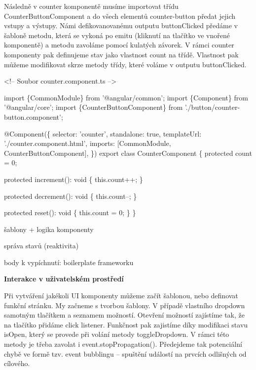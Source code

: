 Následně v counter komponentě musíme importovat třídu CounterButtonComponent a do všech elementů counter-button předat jejich vstupy a výstupy. 
Námi defikovanovanému outputu buttonClicked předáme v šabloně metodu, která se vykoná po emitu (kliknutí na tlačítko ve vnořené komponentě) a metodu zavoláme pomocí kulatých závorek. 
V rámci counter komponenty pak definujeme stav jako vlastnost count na třídě. Vlastnost pak můžeme modifikovat skrze metody třídy, které voláme v outputu buttonClicked.

\begin{prog}
<!-- Soubor counter.component.ts -->

import \{CommonModule\} from '@angular/common';
import \{Component\} from '@angular/core';
import \{CounterButtonComponent\} from './button/counter-button.component';

@Component(\{
  selector: 'counter',
  standalone: true,
  templateUrl: './counter.component.html',
  imports: [CommonModule, CounterButtonComponent],
\})
export class CounterComponent \{
  protected count = 0;

  protected increment(): void \{
    this.count++;
  \}

  protected decrement(): void \{
    this.count--;
  \}

  protected reset(): void \{
    this.count = 0;
  \}
\}
\end{prog}

\begin{citemize}
	\item šablony + logika komponenty
	\item správa stavů (reaktivita)
	\item body k vypíchnutí: boilerplate frameworku
\end{citemize}

\begin{flushleft}
  \textbf{Interakce v uživatelském prostředí}
\end{flushleft}

Při vytváření jakékoli UI komponenty můžeme začít šablonou, nebo definovat funkční stránku. My začneme s tvorbou šablony. V případě vlastního dropdown samotným tlačítkem a seznamem možností. 
Otevření možností zajístíme tak, že na tlačítko přidáme click listener. Funkčnost pak zajistíme díky modifikaci stavu isOpen, který se provede při volání metody toggleDropdown. 
V rámci této metody je třeba zavolat i event.stopPropagation(). Předejdeme tak potenciální chybě ve formě tzv. event bubblingu -- spuštění událostí na prvcích odlišných od cílového.

